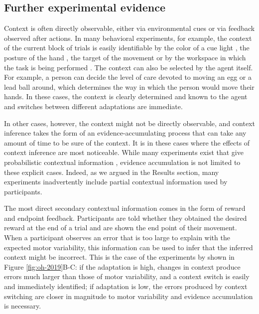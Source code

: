 \documentclass[a4paper,doc,floatsintext,natbib]{apa6}
\def \fref #1{Figure \ref{#1}}     %
\begin{document}
\subsection{Further experimental evidence}
Context is often directly observable, either via environmental cues or via feedback observed after actions. In many behavioral experiments, for example, the context of the current block of trials is easily identifiable by the color of a cue light \citep[e.g.][]{Ethier_Spontaneous_2008}, the posture of the hand \citep[e.g.][]{Gandolfo_Motor_1996}, the target of the movement \citep[e.g.][]{Lee_Dual_2009} or by the workspace in which the task is being performed \citep[e.g.][]{Shadmehr_Adaptive_1994}. The context can also be selected by the agent itself. For example, a person can decide the level of care devoted to moving an egg or a lead ball around, which determines the way in which the person would move their hands. In these cases, the context is clearly determined and known to the agent and switches between different adaptations are immediate.

In other cases, however, the context might not be directly observable, and context inference takes the form of an evidence-accumulating process that can take any amount of time to be sure of the context. It is in these cases where the effects of context inference are most noticeable. While many experiments exist that give probabilistic contextual information \cite[e.g.][]{Scholz_uncontrolled_1999,Behrens_Learning_2007,Nassar_Dissociable_2019}, evidence accumulation is not limited to these explicit cases. Indeed, as we argued in the Results section, many experiments inadvertently include partial contextual information used by participants.

The most direct secondary contextual information comes in the form of reward and endpoint feedback. Participants are told whether they obtained the desired reward at the end of a trial and are shown the end point of their movement. When a participant observes an error that is too large to explain with the expected motor variability, this information can be used to infer that the inferred context might be incorrect. This is the case of the experiments by \cite{Oh_Minimizing_2019} shown in \fref{fig:oh-2019}B-C: if the adaptation is high, changes in context produce errors much larger than those of motor variability, and a context switch is easily and immediately identified; if adaptation is low, the errors produced by context switching are closer in magnitude to motor variability and evidence accumulation is necessary.
\end{document}

